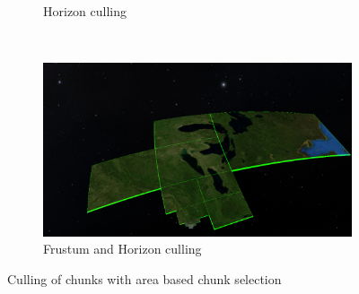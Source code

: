 \begin{figure}[h]
\begin{subfigure}[bt]{0.4\textwidth}
        \caption{Horizon culling}
    \end{subfigure}
    ~
    \begin{subfigure}[bt]{0.4\textwidth}
        \includegraphics[width=\textwidth]{figures/results/culling/afh.png}
        \caption{Frustum and Horizon culling}
    \end{subfigure}
    \caption{Culling of chunks with area based chunk selection}
    \label{fig:cullinga}
\end{figure}

